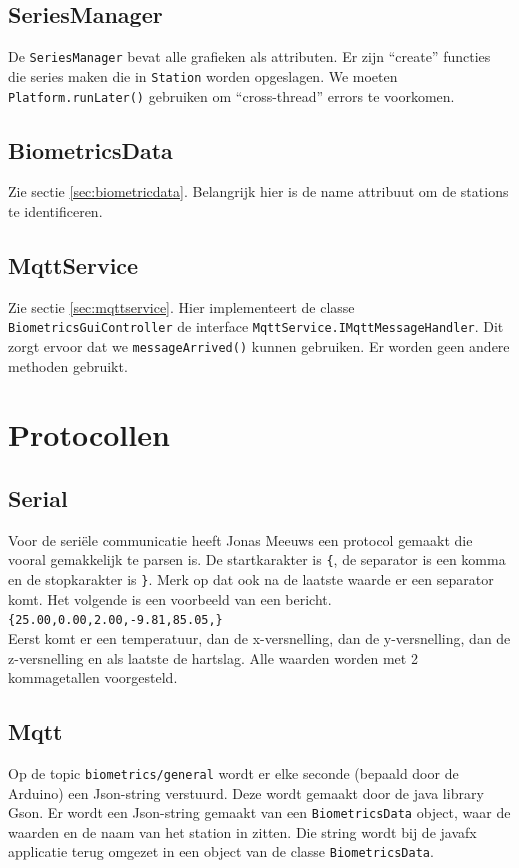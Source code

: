 \documentclass[a4paper]{report}
\newcommand{\code}[1]{\colorbox{light-gray}{\texttt{#1}}}
\begin{document}
        \subsection{SeriesManager}
            De \code{SeriesManager} bevat alle grafieken als attributen.
            Er zijn ``create'' functies die series maken die in \code{Station} worden opgeslagen.
            We moeten \code{Platform.runLater()} gebruiken om ``cross-thread'' errors te voorkomen.

        \subsection{BiometricsData}
            Zie sectie \ref{sec:biometricdata}.
            Belangrijk hier is de name attribuut om de stations te identificeren.

        \subsection{MqttService}
            Zie sectie \ref{sec:mqttservice}.
            Hier implementeert de classe \code{BiometricsGuiController} de interface \code{MqttService.IMqttMessageHandler}.
            Dit zorgt ervoor dat we \code{messageArrived()} kunnen gebruiken.
            Er worden geen andere methoden gebruikt.

    \section{Protocollen}
        \subsection{Serial}
            Voor de seri\"ele communicatie heeft Jonas Meeuws een protocol gemaakt die vooral gemakkelijk te parsen is.
            De startkarakter is \verb!{!, de separator is een komma en de stopkarakter is \verb!}!.
            Merk op dat ook na de laatste waarde er een separator komt.
            Het volgende is een voorbeeld van een bericht.\\
            \indent \verb!{25.00,0.00,2.00,-9.81,85.05,}!\\
            Eerst komt er een temperatuur, dan de x-versnelling, dan de y-versnelling, dan de z-versnelling en als laatste de hartslag.
            Alle waarden worden met 2 kommagetallen voorgesteld.
            
        \subsection{Mqtt}
            Op de topic \code{biometrics/general} wordt er elke seconde (bepaald door de Arduino) een Json-string verstuurd.
            Deze wordt gemaakt door de java library Gson.
            Er wordt een Json-string gemaakt van een \code{BiometricsData} object, waar de waarden en de naam van het station in zitten.
            Die string wordt bij de javafx applicatie terug omgezet in een object van de classe \code{BiometricsData}.
            
\end{document}
